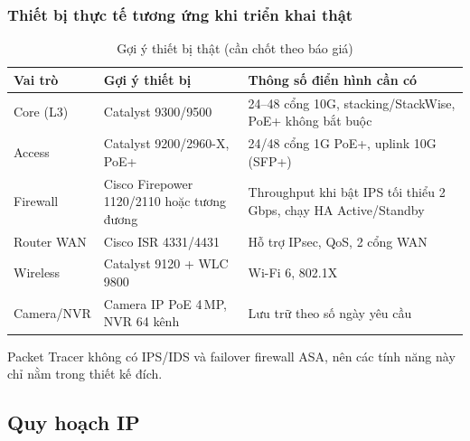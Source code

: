 \subsubsection{Thiết bị thực tế tương ứng khi triển khai thật}
\label{sec:real-devices}
\begin{small}
\setlength{\tabcolsep}{4pt}
\begin{longtable}{|p{2.4cm}|p{4.6cm}|p{6.8cm}|}
\caption{Gợi ý thiết bị thật (cần chốt theo báo giá)} \label{tab:real_devices} \\
\hline
\textbf{Vai trò} & \textbf{Gợi ý thiết bị} & \textbf{Thông số điển hình cần có} \\ \hline
\endhead
Core (L3) & Catalyst 9300/9500 & 24--48 cổng 10G, stacking/StackWise, PoE+ không bắt buộc \\ \hline
Access & Catalyst 9200/2960-X, PoE+ & 24/48 cổng 1G PoE+, uplink 10G (SFP+) \\ \hline
Firewall & Cisco Firepower 1120/2110 hoặc tương đương & Throughput khi bật IPS tối thiểu 2\,Gbps, chạy HA Active/Standby \\ \hline
Router WAN & Cisco ISR 4331/4431 & Hỗ trợ IPsec, QoS, 2 cổng WAN \\ \hline
Wireless & Catalyst 9120 + WLC 9800 & Wi-Fi 6, 802.1X \\ \hline
Camera/NVR & Camera IP PoE 4\,MP, NVR 64 kênh & Lưu trữ theo số ngày yêu cầu \\ \hline
\end{longtable}
\end{small}
\noindent Packet Tracer không có IPS/IDS và failover firewall ASA, nên các tính năng này chỉ nằm trong thiết kế đích.

\subsection{Quy hoạch IP}

